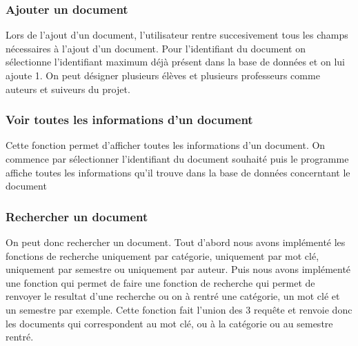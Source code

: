 \documentclass[11pt]{report}
\begin{document}
\subsubsection{Ajouter un document}

Lors de l'ajout d'un document, l'utilisateur rentre succesivement tous les champs nécessaires à l'ajout d'un document. Pour l'identifiant du document on sélectionne l'identifiant maximum déjà présent dans la base de données et on lui ajoute 1. 
On peut désigner plusieurs élèves et plusieurs professeurs comme auteurs et suiveurs du projet.

\subsubsection{Voir toutes les informations d'un document}

Cette fonction permet d'afficher toutes les informations d'un document. 
On commence par sélectionner l'identifiant du document souhaité puis le programme affiche toutes les informations qu'il trouve dans la base de données concerntant le document


\subsubsection{Rechercher un document}
On peut donc rechercher un document. Tout d'abord nous avons implémenté les fonctions de recherche uniquement par catégorie, uniquement par mot clé, uniquement par semestre ou uniquement par auteur. Puis nous avons implémenté une fonction qui permet de faire une fonction de recherche qui permet de renvoyer le resultat d'une recherche ou on à rentré une catégorie, un mot clé et un semestre par exemple. Cette fonction fait l'union des 3 requête et renvoie donc les documents qui correspondent au mot clé, ou à la catégorie ou au semestre rentré. 
\end{document}
